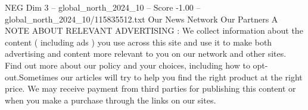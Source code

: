 \begin{textsample}{NEG Dim 3 – global\_north\_2024\_10 – Score -1.00 – global\_north\_2024\_10/115835512.txt}
Our News Network Our Partners A NOTE ABOUT RELEVANT ADVERTISING : We collect information about the content ( including ads ) you use across this site and use it to make both advertising and content more relevant to you on our network and other sites.
Find out more about our policy and your choices, including how to opt-out.Sometimes our articles will try to help you find the right product at the right price.
We may receive payment from third parties for publishing this content or when you make a purchase through the links on our sites.

\end{textsample}
